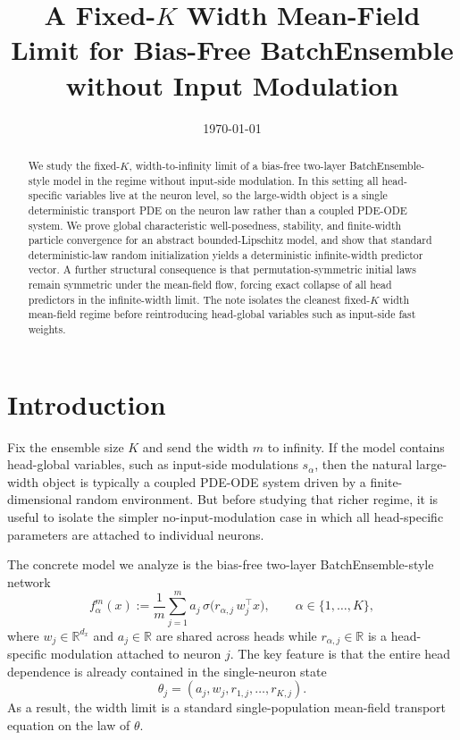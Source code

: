 \documentclass[11pt]{article}
\title{A Fixed-\texorpdfstring{$K$}{K} Width Mean-Field Limit for Bias-Free BatchEnsemble without Input Modulation}
\author{}
\date{\today}
\theoremstyle{definition}
\newcommand{\R}{\mathbb{R}}
\begin{document}
\maketitle

\begin{abstract}
We study the fixed-$K$, width-to-infinity limit of a bias-free two-layer BatchEnsemble-style model in the regime without input-side modulation. In this setting all head-specific variables live at the neuron level, so the large-width object is a single deterministic transport PDE on the neuron law rather than a coupled PDE-ODE system. We prove global characteristic well-posedness, stability, and finite-width particle convergence for an abstract bounded-Lipschitz model, and show that standard deterministic-law random initialization yields a deterministic infinite-width predictor vector. A further structural consequence is that permutation-symmetric initial laws remain symmetric under the mean-field flow, forcing exact collapse of all head predictors in the infinite-width limit. The note isolates the cleanest fixed-$K$ width mean-field regime before reintroducing head-global variables such as input-side fast weights.
\end{abstract}

\section{Introduction}

Fix the ensemble size $K$ and send the width $m$ to infinity. If the model contains head-global variables, such as input-side modulations $s_\alpha$, then the natural large-width object is typically a coupled PDE-ODE system driven by a finite-dimensional random environment. But before studying that richer regime, it is useful to isolate the simpler no-input-modulation case in which all head-specific parameters are attached to individual neurons.

The concrete model we analyze is the bias-free two-layer BatchEnsemble-style network
\begin{equation}
  f_\alpha^m(x)
  :=
  \frac1m\sum_{j=1}^m
  a_j\,\sigma\!\bigl(r_{\alpha,j}\,w_j^\top x\bigr),
  \qquad
  \alpha\in\{1,\dots,K\},
  \label{eq:intro-model}
\end{equation}
where $w_j\in\R^{d_x}$ and $a_j\in\R$ are shared across heads while
$r_{\alpha,j}\in\R$ is a head-specific modulation attached to neuron $j$. The key
feature is that the entire head dependence is already contained in the single-neuron
state
\[
  \theta_j=(a_j,w_j,r_{1,j},\dots,r_{K,j}).
\]
As a result, the width limit is a standard single-population mean-field transport
equation on the law of $\theta$.
\end{document}
